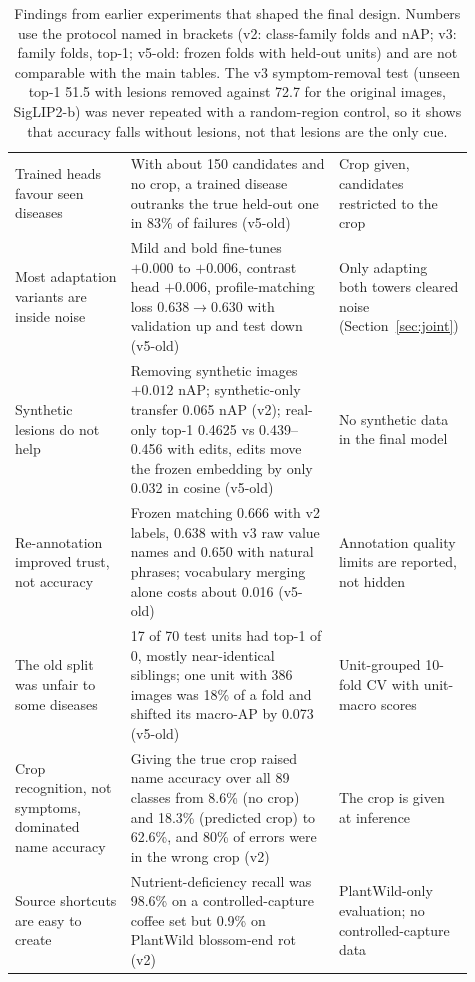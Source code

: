 \documentclass[11pt]{article}
\begin{document}
\begin{table}[!htbp]
\begin{tabular}{p{0.25\linewidth}p{0.45\linewidth}p{0.21\linewidth}}
Trained heads favour seen diseases & With about 150 candidates and no crop, a trained disease outranks the true held-out one in 83\% of failures (v5-old) & Crop given, candidates restricted to the crop \\
Most adaptation variants are inside noise & Mild and bold fine-tunes $+0.000$ to $+0.006$, contrast head $+0.006$, profile-matching loss $0.638\to0.630$ with validation up and test down (v5-old) & Only adapting both towers cleared noise (Section~\ref{sec:joint}) \\
Synthetic lesions do not help & Removing synthetic images $+0.012$ nAP; synthetic-only transfer 0.065 nAP (v2); real-only top-1 0.4625 vs 0.439--0.456 with edits, edits move the frozen embedding by only 0.032 in cosine (v5-old) & No synthetic data in the final model \\
Re-annotation improved trust, not accuracy & Frozen matching 0.666 with v2 labels, 0.638 with v3 raw value names and 0.650 with natural phrases; vocabulary merging alone costs about 0.016 (v5-old) & Annotation quality limits are reported, not hidden \\
The old split was unfair to some diseases & 17 of 70 test units had top-1 of 0, mostly near-identical siblings; one unit with 386 images was 18\% of a fold and shifted its macro-AP by 0.073 (v5-old) & Unit-grouped 10-fold CV with unit-macro scores \\
Crop recognition, not symptoms, dominated name accuracy & Giving the true crop raised name accuracy over all 89 classes from 8.6\% (no crop) and 18.3\% (predicted crop) to 62.6\%, and 80\% of errors were in the wrong crop (v2) & The crop is given at inference \\
Source shortcuts are easy to create & Nutrient-deficiency recall was 98.6\% on a controlled-capture coffee set but 0.9\% on PlantWild blossom-end rot (v2) & PlantWild-only evaluation; no controlled-capture data \\
\bottomrule\end{tabular}
\caption{Findings from earlier experiments that shaped the final design. Numbers use the protocol named in brackets (v2: class-family folds and nAP; v3: family folds, top-1; v5-old: frozen folds with held-out units) and are not comparable with the main tables. The v3 symptom-removal test (unseen top-1 51.5 with lesions removed against 72.7 for the original images, SigLIP2-b) was never repeated with a random-region control, so it shows that accuracy falls without lesions, not that lesions are the only cue.}\label{tab:lessons}
\end{table}
\end{document}
